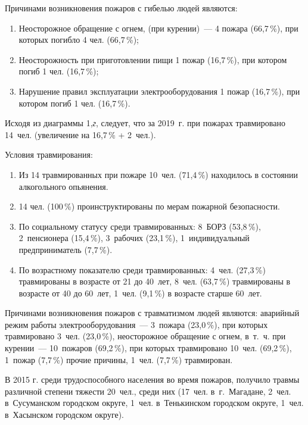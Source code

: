 Причинами возникновения пожаров с гибелью людей являются:
\begin{enumerate}[noitemsep]\vspace{-8pt}
\item Неосторожное обращение с огнем, (при курении)~--- 4 пожара (66,7\,\%), при которых погибло 4 чел. (66,7\,\%);
\item Неосторожность при приготовлении пищи 1 пожар (16,7\,\%), при котором погиб 1 чел. (16,7\,\%);
\item Нарушение правил эксплуатации электрооборудования 1 пожар (16,7\,\%), при котором погиб 1 чел. (16,7\,\%).
\end{enumerate}
\vspace{-6pt}

Исходя из диаграммы 1,\textit{г}, следует, что за 2019~г. при пожарах травмировано 14~чел. (увеличение на 16,7\,\% + 2~чел.).

Условия травмирования:
\begin{enumerate}[noitemsep]\vspace{-8pt}
\item Из 14 травмированных при пожаре 10~чел.  (71,4\,\%) находилось в состоянии алкогольного опьянения.
\item 14 чел. (100\,\%) проинструктированы по мерам пожарной безопасности.
\item По социальному статусу среди травмированных: 8~БОРЗ (53,8\,\%), 2~пенсионера (15,4\,\%), 3~рабочих (23,1\,\%), 1~индивидуальный предприниматель (7,7\,\%).
\item По возрастному показателю среди травмированных: 4~чел. (27,3\,\%) травмированы в возрасте от 21 до 40~лет, 8~чел. (63,7\,\%) травмированы в возрасте от 40 до 60~лет, 1~чел. (9,1\,\%) в возрасте старше 60~лет.
\end{enumerate}
\vspace{-8pt}

Причинами возникновения пожаров с травматизмом людей являются: аварийный режим работы электрооборудования~--- 3~пожара (23,0\,\%), при которых травмировано 3~чел. (23,0\,\%), неосторожное обращение с огнем, в~т.~ч. при курении~--- 10~пожаров (69,2\,\%), при которых травмировано 10~чел. (69,2\,\%), 1~пожар (7,7\,\%) прочие причины, 1~чел. (7,7\,\%) травмирован.

В 2015 г. среди трудоспособного населения во время пожаров, получило травмы различной степени тяжести 20~чел., среди них (17~чел. в~г.~Магадане, 2~чел. в~Сусуманском городском округе, 1~чел. в~Тенькинском городском округе, 1~чел. в~Хасынском городском округе).

